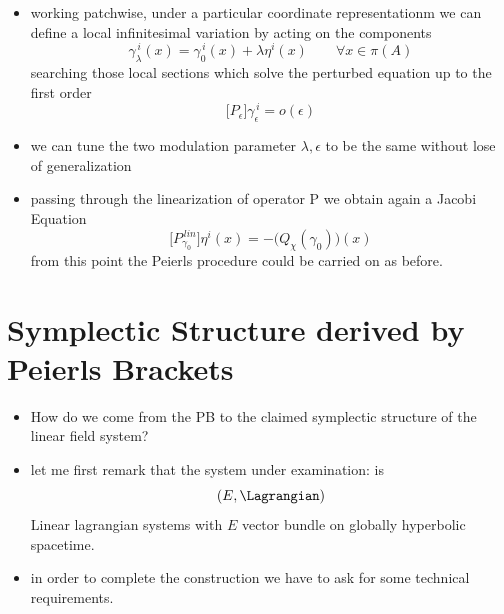 \documentclass[a4paper,11pt]{scrartcl}
\begin{document}
\begin{itemize}
\begin{minipage}{0.5\textwidth}
\begin{itemize}
            \end{itemize}
        \end{minipage}    
        \item working patchwise, under a particular coordinate representationm we can define a local infinitesimal variation by acting on the components
        $$\gamma_\lambda ^{\, i}(x) = \gamma_0^{\, i}(x) + \lambda \eta^i(x) \qquad \forall x\in \pi(A) $$
        searching those local sections  which solve the perturbed equation up to the first order
        $$\big[ P_\epsilon \big] \gamma_\epsilon^{\,i} = o(\epsilon)$$
        \item we can tune the two modulation parameter $\lambda, \epsilon$ to be the same without lose of generalization
        \item passing through the linearization of operator P we obtain again a Jacobi Equation
        $$\biggr[P_{\gamma_0}^{\, lin} \biggr] \eta^i(x) = -\biggr(Q_\chi(\gamma_0)\biggr)(x)$$
        from this point the Peierls procedure could be carried on as before.
    \end{itemize}
    \newpage
    \section{Symplectic Structure derived by Peierls Brackets}
    \begin{itemize}
        \item How do we come from the PB to the claimed symplectic structure of the linear field system?
        \item let me first remark that the system under examination: is $$(E,\Lagrangian)$$ Linear lagrangian systems with $E$ vector bundle on globally hyperbolic spacetime.
        
        \item in order to complete the construction we have to ask for some technical requirements. 
    \end{itemize}
\end{document}
